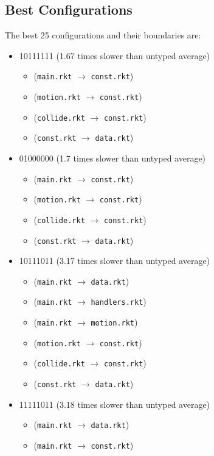 \documentclass{article}
\newcommand{\mono}[1]{\texttt{#1}}
\begin{document}
\subsection{Best Configurations}
The best 25 configurations and their boundaries are:
\begin{itemize}
\item 10111111 (1.67 times slower than untyped average)
  \begin{itemize}
  \item (\mono{main.rkt} $\rightarrow$ \mono{const.rkt})
  \item (\mono{motion.rkt} $\rightarrow$ \mono{const.rkt})
  \item (\mono{collide.rkt} $\rightarrow$ \mono{const.rkt})
  \item (\mono{const.rkt} $\rightarrow$ \mono{data.rkt})
  \end{itemize}
\item 01000000 (1.7 times slower than untyped average)
  \begin{itemize}
  \item (\mono{main.rkt} $\rightarrow$ \mono{const.rkt})
  \item (\mono{motion.rkt} $\rightarrow$ \mono{const.rkt})
  \item (\mono{collide.rkt} $\rightarrow$ \mono{const.rkt})
  \item (\mono{const.rkt} $\rightarrow$ \mono{data.rkt})
  \end{itemize}
\item 10111011 (3.17 times slower than untyped average)
  \begin{itemize}
  \item (\mono{main.rkt} $\rightarrow$ \mono{data.rkt})
  \item (\mono{main.rkt} $\rightarrow$ \mono{handlers.rkt})
  \item (\mono{main.rkt} $\rightarrow$ \mono{motion.rkt})
  \item (\mono{motion.rkt} $\rightarrow$ \mono{const.rkt})
  \item (\mono{collide.rkt} $\rightarrow$ \mono{const.rkt})
  \item (\mono{const.rkt} $\rightarrow$ \mono{data.rkt})
  \end{itemize}
\item 11111011 (3.18 times slower than untyped average)
  \begin{itemize}
  \item (\mono{main.rkt} $\rightarrow$ \mono{data.rkt})
  \item (\mono{main.rkt} $\rightarrow$ \mono{const.rkt})

\end{itemize}
\end{itemize}
\end{document}
